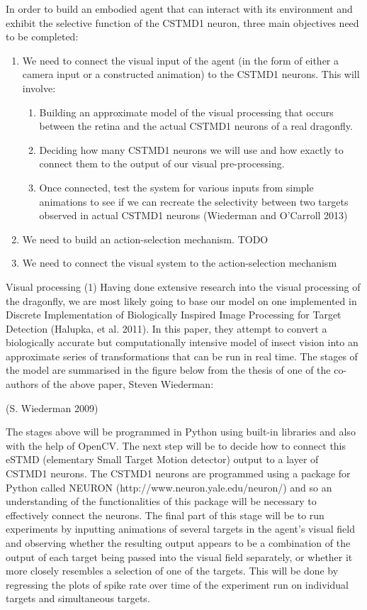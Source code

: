 \documentclass[a4paper,11pt]{article}
\begin{document}
In order to build an embodied agent that can interact with its environment and exhibit the selective function of the CSTMD1 neuron, three main objectives need to be completed:
\begin{enumerate}
	\item We need to connect the visual input of the agent (in the form 	of either a camera input or a constructed animation) to the CSTMD1 neurons. This will involve:
	\begin{enumerate}
		\item Building an approximate model of the visual processing that occurs between the retina and the actual CSTMD1 neurons of a real dragonfly.
		\item Deciding how many CSTMD1 neurons we will use and how exactly to connect them to the output of our visual pre-processing.
		\item Once connected, test the system for various inputs from simple animations to see if we can recreate the selectivity between two targets observed in actual CSTMD1 neurons (Wiederman and O'Carroll 2013)
	\end{enumerate}
	\item We need to build an action-selection mechanism. TODO
	\item We need to connect the visual system to the action-selection mechanism
\end{enumerate} 
 
Visual processing (1)
Having done extensive research into the visual processing of the dragonfly, we are most likely going to base our model on one implemented in Discrete Implementation of Biologically Inspired Image Processing for Target Detection (Halupka, et al. 2011). In this paper, they attempt to convert a biologically accurate but computationally intensive model of insect vision into an approximate series of transformations that can be run in real time. The stages of the model are summarised in the figure below from the thesis of one of the co-authors of the above paper, Steven Wiederman:

 (S. Wiederman 2009)
 
The stages above will be programmed in Python using built-in libraries and also with the help of OpenCV.
The next step will be to decide how to connect this eSTMD (elementary Small Target Motion detector) output to a layer of CSTMD1 neurons. The CSTMD1 neurons are programmed using a package for Python called NEURON (http://www.neuron.yale.edu/neuron/) and so an understanding of the functionalities of this package will be necessary to effectively connect the neurons.
The final part of this stage will be to run experiments by inputting animations of several targets in the agent’s visual field and observing whether the resulting output appears to be a combination of the output of each target being passed into the visual field separately, or whether it more closely resembles a selection of one of the targets. This will be done by regressing the plots of spike rate over time of the experiment run on individual targets and simultaneous targets.
\end{document}

